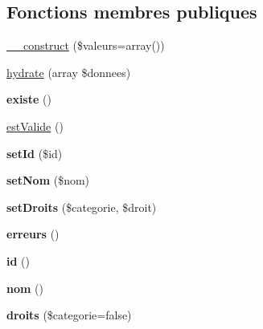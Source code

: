 \subsection*{Fonctions membres publiques}
\begin{DoxyCompactItemize}
\item 
\hyperlink{class_library_1_1_entities_1_1_groupe_a6a8dd1d972925f6a5e98fadc554f6710}{\+\_\+\+\_\+construct} (\$valeurs=array())
\item 
\hyperlink{class_library_1_1_entities_1_1_groupe_a87c5a7da7b956f93a01db1a727d9932c}{hydrate} (array \$donnees)
\item 
\hypertarget{class_library_1_1_entities_1_1_groupe_ab8d4d5d88bf20eccb470f6c675299675}{{\bfseries existe} ()}\label{class_library_1_1_entities_1_1_groupe_ab8d4d5d88bf20eccb470f6c675299675}

\item 
\hyperlink{class_library_1_1_entities_1_1_groupe_ad2696392106fc5da9c1ab0e5f8985531}{est\+Valide} ()
\item 
\hypertarget{class_library_1_1_entities_1_1_groupe_a87313ad678fb2a2a8efb435cf0bdb9a0}{{\bfseries set\+Id} (\$id)}\label{class_library_1_1_entities_1_1_groupe_a87313ad678fb2a2a8efb435cf0bdb9a0}

\item 
\hypertarget{class_library_1_1_entities_1_1_groupe_a3c162f28ffbb9c8026c0d84f722e5060}{{\bfseries set\+Nom} (\$nom)}\label{class_library_1_1_entities_1_1_groupe_a3c162f28ffbb9c8026c0d84f722e5060}

\item 
\hypertarget{class_library_1_1_entities_1_1_groupe_a1e0a191a8bae34c98eaf09b5d84b7a64}{{\bfseries set\+Droits} (\$categorie, \$droit)}\label{class_library_1_1_entities_1_1_groupe_a1e0a191a8bae34c98eaf09b5d84b7a64}

\item 
\hypertarget{class_library_1_1_entities_1_1_groupe_afa6e81c26f240d44bb65d8483b49be53}{{\bfseries erreurs} ()}\label{class_library_1_1_entities_1_1_groupe_afa6e81c26f240d44bb65d8483b49be53}

\item 
\hypertarget{class_library_1_1_entities_1_1_groupe_a087060b582403885d08e89ad894ecc5d}{{\bfseries id} ()}\label{class_library_1_1_entities_1_1_groupe_a087060b582403885d08e89ad894ecc5d}

\item 
\hypertarget{class_library_1_1_entities_1_1_groupe_afe963ab697d654c0c2cb5f8860324a31}{{\bfseries nom} ()}\label{class_library_1_1_entities_1_1_groupe_afe963ab697d654c0c2cb5f8860324a31}

\item 
\hypertarget{class_library_1_1_entities_1_1_groupe_aa88abad4ffef2161e83e985fba3f6164}{{\bfseries droits} (\$categorie=false)}\label{class_library_1_1_entities_1_1_groupe_aa88abad4ffef2161e83e985fba3f6164}

\end{DoxyCompactItemize}
